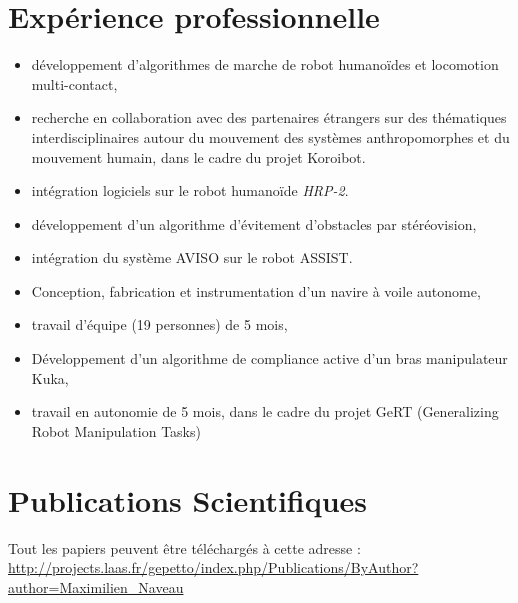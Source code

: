 \documentclass[11pt,a4paper]{moderncv}
\newcommand{\items}{\item \hspace{2mm}}
\begin{document}
\section{Exp\'erience professionnelle}
{
\begin{itemize}%
\items d\'eveloppement d'algorithmes de marche de robot humano\"ides et locomotion multi-contact,
\items recherche en collaboration avec des partenaires \'etrangers sur des th\'ematiques interdisciplinaires autour du mouvement des syst\`emes anthropomorphes et du mouvement humain, dans le cadre du projet Koroibot.
\items int\'egration logiciels sur le robot humano\"ide \emph{HRP-2}.
\newline{}
\end{itemize}
}
%
%
{
\begin{itemize}%
\items d\'eveloppement d'un algorithme d'\'evitement d'obstacles par st\'er\'eovision,
\items int\'egration du syst\`eme AVISO sur le robot ASSIST.
\newline{}
\end{itemize}
}
%
%
{
\begin{itemize}%
\items Conception, fabrication et instrumentation d'un navire \`a voile autonome,
\items travail d'\'equipe (19 personnes) de 5 mois,
\newline{}
\end{itemize}
}
%
%
%
{
\begin{itemize}%
\items D\'eveloppement d'un algorithme de compliance active d'un bras manipulateur Kuka,
\items travail en autonomie de 5 mois, dans le cadre du projet GeRT (Generalizing Robot Manipulation Tasks)
\newline{}
\end{itemize}
}

\newpage

\section{Publications Scientifiques}

Tout les papiers peuvent \^etre t\'el\'echarg\'es \`a cette adresse :
\url{http://projects.laas.fr/gepetto/index.php/Publications/ByAuthor?author=Maximilien_Naveau}\\
\end{document}
